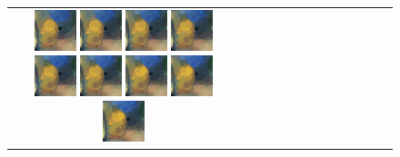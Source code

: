 \documentclass[3p,times,procedia]{elsarticle}
\begin{document}
\begin{figure}[H]
\begin{tabular}{c c c c c c c c c c c c c}
        \includegraphics[width=12mm]{figures/mul/cafe_terrace_at_nightpass15_best.png}
        
        \includegraphics[width=12mm]{figures/mul/cafe_terrace_at_nightpass16_best.png}
        
        \includegraphics[width=12mm]{figures/mul/cafe_terrace_at_nightpass17_best.png}
        
        \includegraphics[width=12mm]{figures/mul/cafe_terrace_at_nightpass18_best.png}
        
        \includegraphics[width=12mm]{figures/mul/cafe_terrace_at_nightpass19_best.png}
        
        \includegraphics[width=12mm]{figures/mul/cafe_terrace_at_nightpass20_best.png}
        
        \includegraphics[width=12mm]{figures/mul/cafe_terrace_at_nightpass21_best.png}
        
        \includegraphics[width=12mm]{figures/mul/cafe_terrace_at_nightpass22_best.png}
        
        \includegraphics[width=12mm]{figures/mul/cafe_terrace_at_nightpass23_best.png}
        

\end{tabular}
\end{figure}
\end{document}
